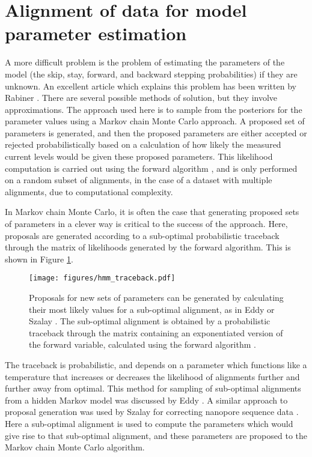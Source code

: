 \section{Alignment of data for model parameter estimation}

A more difficult problem is the problem of estimating the parameters of the model (the skip, stay, forward, and backward stepping probabilities) if they are unknown.  An excellent article which explains this problem has been written by Rabiner \citep{Rabiner1989}.  There are several possible methods of solution, but they involve approximations.  The approach used here is to sample from the posteriors for the parameter values using a Markov chain Monte Carlo approach.  A proposed set of parameters is generated, and then the proposed parameters are either accepted or rejected probabilistically based on a calculation of how likely the measured current levels would be given these proposed parameters.  This likelihood computation is carried out using the forward algorithm \citep{Rabiner1989}, and is only performed on a random subset of alignments, in the case of a dataset with multiple alignments, due to computational complexity.

In Markov chain Monte Carlo, it is often the case that generating proposed sets of parameters in a clever way is critical to the success of the approach.  Here, proposals are generated according to a sub-optimal probabilistic traceback through the matrix of likelihoods generated by the forward algorithm.  This is shown in Figure \ref{fig:data_analysis_traceback}.

\begin{figure}[h]
\begin{centering}
\texttt{[image: figures/hmm\_traceback.pdf]}
\caption[Data analysis: parameter estimation MCMC proposals]{Proposals for new sets of parameters can be generated by calculating their most likely values for a sub-optimal alignment, as in Eddy \citep{Eddy1995} or Szalay \citep{Szalay2015}.  The sub-optimal alignment is obtained by a probabilistic traceback through the matrix containing an exponentiated version of the forward variable, calculated using the forward algorithm \citep{Rabiner1989}.}
\label{fig:data_analysis_traceback}
\end{centering}
\end{figure}

The traceback is probabilistic, and depends on a parameter which functions like a temperature that increases or decreases the likelihood of alignments further and further away from optimal.  This method for sampling of sub-optimal alignments from a hidden Markov model was discussed by Eddy \citep{Eddy1995}.  A similar approach to proposal generation was used by Szalay for correcting nanopore sequence data \citep{Szalay2015}.  Here a sub-optimal alignment is used to compute the parameters which would give rise to that sub-optimal alignment, and these parameters are proposed to the Markov chain Monte Carlo algorithm.

